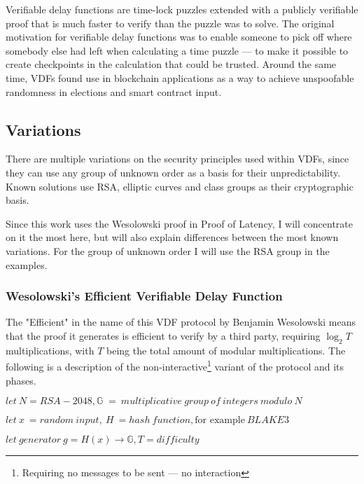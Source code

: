Verifiable delay functions are time-lock puzzles extended with a publicly verifiable proof that is much faster to verify than the puzzle was to solve. The original motivation for verifiable delay functions was to enable someone to pick off where somebody else had left when calculating a time puzzle --- to make it possible to create checkpoints in the calculation that could be trusted. Around the same time, VDFs found use in blockchain applications as a way to achieve unspoofable randomness in elections and smart contract input.

\subsection{Variations}
There are multiple variations on the security principles used within VDFs, since they can use any group of unknown order as a basis for their unpredictability. Known solutions use RSA, elliptic curves and class groups as their cryptographic basis.

Since this work uses the Wesolowski proof in Proof of Latency, I will concentrate on it the most here, but will also explain differences between the most known variations. For the group of unknown order I will use the RSA group in the examples.

\subsubsection{Wesolowski's Efficient Verifiable Delay Function}
The "Efficient" in the name of this VDF protocol by Benjamin Wesolowski means that the proof it generates is efficient to verify by a third party, requiring \( \log _{2} T \) multiplications, with \( T \) being the total amount of modular multiplications. The following is a description of the non-interactive\footnote{Requiring no messages to be sent --- no interaction} variant of the protocol and its phases.

\( let \: N = RSA-2048, \mathbb{G} \; = \: multiplicative \: group \: of \: integers \: modulo \: N \)

\( let \: x \: = random \: input,  \: H \: = hash \: function, \text{for example} \: BLAKE3 \)

\( let \: generator \: g = H(x) \to \mathbb{G}, T = difficulty \)

